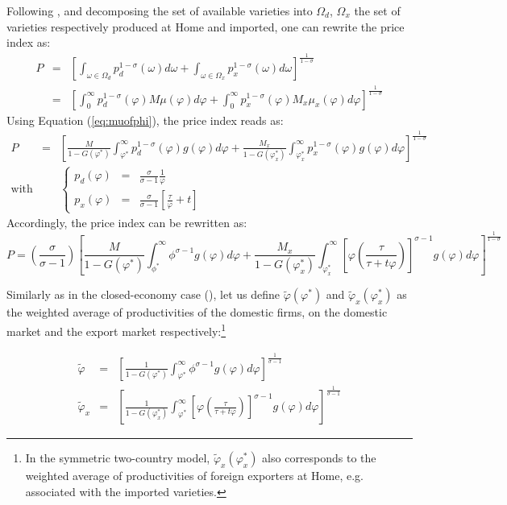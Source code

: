 \documentclass[a4paper,11pt]{article}
\begin{document}
Following \cite{melitz}, and decomposing the set of available varieties into $\Omega_d$, $\Omega_x$ the set of varieties respectively produced at Home and imported, one can rewrite the price index as:
\begin{eqnarray*}
P &=& \left[\int_{\omega \in \Omega_d} p_d^{1-\sigma}(\omega)d\omega + \int_{\omega \in \Omega_x} p_x^{1-\sigma}(\omega)d\omega  \right]^{\frac{1}{1-\sigma}} \\
&=& \left[\int_{0}^\infty p_d^{1-\sigma}(\varphi)M\mu(\varphi)d\varphi + \int_{0}^\infty p_x^{1-\sigma}(\varphi)M_x \mu_x(\varphi)d\varphi  \right]^{\frac{1}{1-\sigma}}
\end{eqnarray*}
Using Equation (\ref{eq:muofphi}), the price index reads as:
\begin{eqnarray*}
P &=& \left[\frac{M}{1-G(\varphi^\ast)}\int_{\varphi^\ast}^\infty p_d^{1-\sigma}(\varphi)g(\varphi)d\varphi + \frac{M_x}{1-G(\varphi_x^\ast)}\int_{\varphi^\ast_x}^\infty p_x^{1-\sigma}(\varphi)g(\varphi)d\varphi  \right]^{\frac{1}{1-\sigma}} \\
\text{with}&& \left\{
\begin{array}{lll}
p_d(\varphi)&=& \frac{\sigma}{\sigma-1} \frac{1}{\varphi}\\
p_x(\varphi)&=& \frac{\sigma}{\sigma-1} \left[\frac{\tau}{\varphi} +t\right]
\end{array}
\right.
\end{eqnarray*}
Accordingly, the price index can be rewritten as:
$$P = \left(\frac{\sigma}{\sigma-1}\right)\left[\frac{M}{1-G(\varphi^\ast)}\int_{\phi^\ast}^\infty \phi^{\sigma-1}g(\varphi)d\varphi + \frac{M_x}{1-G(\varphi_x^\ast)}\int_{\varphi^\ast_x}^\infty \left[\varphi \left(\frac{\tau}{\tau+t \varphi}  \right)  \right]^{\sigma-1}g(\varphi)d\varphi  \right]^{\frac{1}{1-\sigma}}$$


Similarly as in the closed-economy case (\cite{melitz}), let us define $\widetilde{\varphi}(\varphi^\ast)$ and $\widetilde{\varphi}_x(\varphi_x^\ast)$ as the weighted average of productivities of the domestic firms, on the domestic market and the export market respectively:\footnote{In the symmetric two-country model, $\widetilde{\varphi}_x(\varphi_x^\ast)$ also corresponds to the weighted average of productivities of foreign exporters at Home, e.g. associated with the imported varieties.}

\begin{eqnarray}
\widetilde{\varphi} &=& \left[\frac{1}{1-G(\varphi^\ast)}\int_{\varphi^\ast}^\infty \phi^{\sigma-1}g(\varphi)d\varphi   \right]^{\frac{1}{\sigma-1}} \label{eq:def_phitilde}\\
\widetilde{\varphi}_x &=& \left[\frac{1}{1-G(\varphi_x^\ast)}\int_{\varphi^\ast}^\infty \left[\varphi\left(\frac{\tau}{\tau+t \varphi}  \right) \right]^{\sigma-1}g(\varphi)d\varphi   \right]^{\frac{1}{\sigma-1}} \label{eq:def_phitildex}
\end{eqnarray}
\end{document}

